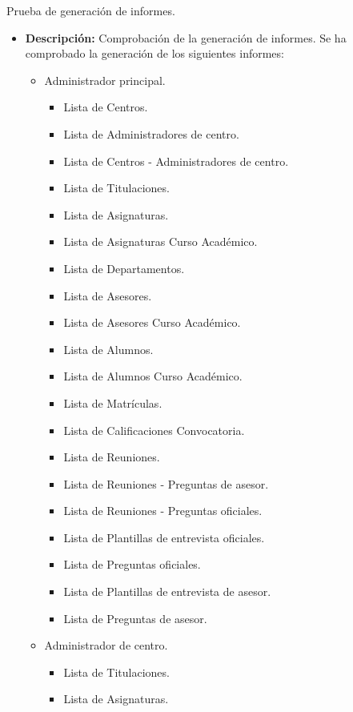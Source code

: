 \item Prueba de generación de informes.
  \begin{itemize}
    \item \textbf{Descripción:} Comprobación de la generación de informes. Se ha
    comprobado la generación de los siguientes informes:

    \begin{itemize}
      \item Administrador principal.
      \begin{itemize}
        \item Lista de Centros.
        \item Lista de Administradores de centro.
        \item Lista de Centros - Administradores de centro.
        \item Lista de Titulaciones.
        \item Lista de Asignaturas.
        \item Lista de Asignaturas Curso Académico.
        \item Lista de Departamentos.
        \item Lista de Asesores.
        \item Lista de Asesores Curso Académico.
        \item Lista de Alumnos.
        \item Lista de Alumnos Curso Académico.
        \item Lista de Matrículas.
        \item Lista de Calificaciones Convocatoria.
        \item Lista de Reuniones.
        \item Lista de Reuniones - Preguntas de asesor.
        \item Lista de Reuniones - Preguntas oficiales.
        \item Lista de Plantillas de entrevista oficiales.
        \item Lista de Preguntas oficiales.
        \item Lista de Plantillas de entrevista de asesor.
        \item Lista de Preguntas de asesor.
      \end{itemize}
      \item Administrador de centro.
      \begin{itemize}
        \item Lista de Titulaciones.
        \item Lista de Asignaturas.

\end{itemize}
\end{itemize}
\end{itemize}
